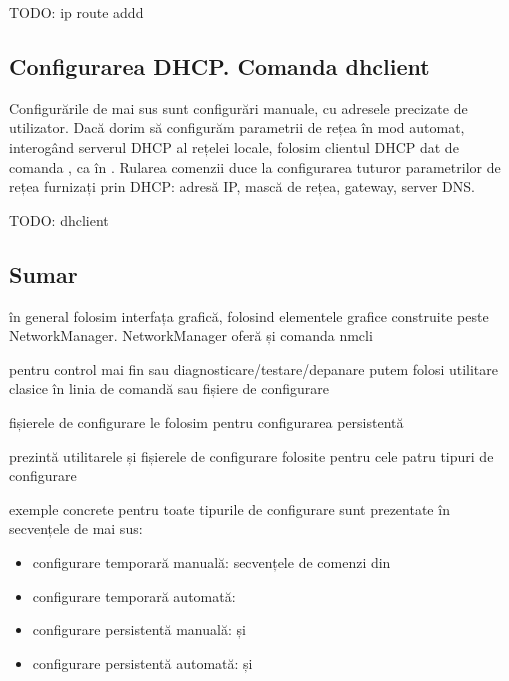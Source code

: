 \begin{screen}[caption={Configurarea gateway-ului},label={lst:net:add-gw}]
TODO: ip route addd
\end{screen}

\subsection{Configurarea DHCP. Comanda dhclient}
\label{sec:net:dhclient}

Configurările de mai sus sunt configurări manuale, cu adresele precizate de utilizator. Dacă dorim să configurăm parametrii de rețea în mod automat, interogând serverul DHCP al rețelei locale, folosim clientul DHCP dat de comanda , ca în . Rularea comenzii  duce la configurarea tuturor parametrilor de rețea furnizați prin DHCP: adresă IP, mască de rețea, gateway, server DNS.

\begin{screen}[caption={Configurarea automată (prin DHCP) din linia de comandă},label={lst:net:add-gw}]
TODO: dhclient
\end{screen}

\subsection{Sumar}
\label{sec:net:config-summary}

în general folosim interfața grafică, folosind elementele grafice construite peste NetworkManager. NetworkManager oferă și comanda nmcli

pentru control mai fin sau diagnosticare/testare/depanare putem folosi utilitare clasice în linia de comandă sau fișiere de configurare

fișierele de configurare le folosim pentru configurarea persistentă

 prezintă utilitarele și fișierele de configurare folosite pentru cele patru tipuri de configurare

exemple concrete pentru toate tipurile de configurare sunt prezentate în secvențele de mai sus:

\begin{itemize}
  \item configurare temporară manuală: secvențele de comenzi din 
  \item configurare temporară automată: 
  \item configurare persistentă manuală:  și 
  \item configurare persistentă automată:  și 
\end{itemize}

